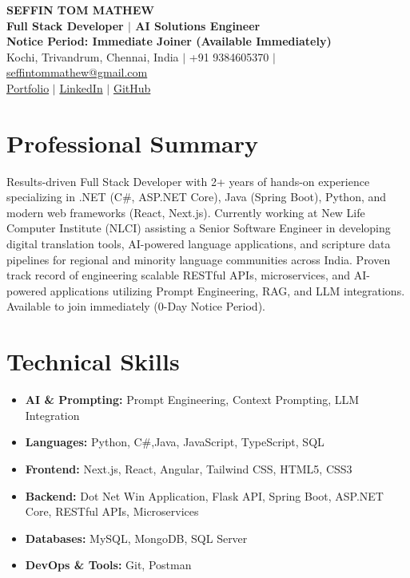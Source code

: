 \documentclass[10pt, letterpaper]{article}
\begin{document}
\begin{center}
    {\LARGE \textbf{SEFFIN TOM MATHEW}} \\ \vspace{2pt}
    \textbf{Full Stack Developer $|$ AI Solutions Engineer} \\
    \textbf{Notice Period: Immediate Joiner (Available Immediately)} \\
    Kochi, Trivandrum, Chennai, India $|$ +91 9384605370 $|$ \href{mailto:seffintommathew@gmail.com}{seffintommathew@gmail.com} \\
    \href{https://protfolio-seff.vercel.app/}{Portfolio} $|$ \href{https://www.linkedin.com/in/seffin-tom-mathew-9a5b4320b}{LinkedIn} $|$ \href{https://github.com/Seffin}{GitHub}
\end{center}
\vspace{-1ex}

\section*{Professional Summary}
Results-driven Full Stack Developer with 2+ years of hands-on experience specializing in .NET (C\#, ASP.NET Core), Java (Spring Boot), Python, and modern web frameworks (React, Next.js). Currently working at New Life Computer Institute (NLCI) assisting a Senior Software Engineer in developing digital translation tools, AI-powered language applications, and scripture data pipelines for regional and minority language communities across India. Proven track record of engineering scalable RESTful APIs, microservices, and AI-powered applications utilizing Prompt Engineering, RAG, and LLM integrations. Available to join immediately (0-Day Notice Period).

\section*{Technical Skills}
\begin{itemize}[leftmargin=0.15in, label={}, itemsep=0pt, parsep=0pt, topsep=2pt]
    \item \textbf{AI \& Prompting:} Prompt Engineering, Context Prompting, LLM Integration
    \item \textbf{Languages:} Python, C\#,Java, JavaScript, TypeScript, SQL
    \item \textbf{Frontend:} Next.js, React, Angular, Tailwind CSS, HTML5, CSS3
    \item \textbf{Backend:} Dot Net Win Application, Flask API, Spring Boot, ASP.NET Core, RESTful APIs, Microservices
    \item \textbf{Databases:} MySQL, MongoDB, SQL Server
    \item \textbf{DevOps \& Tools:} Git, Postman
\end{itemize}
\end{document}
